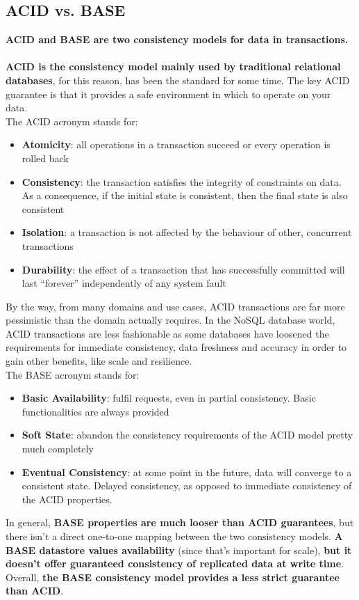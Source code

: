 \documentclass[10pt,a4paper]{article}
\newcommand{\nline}{\\~\\}
\begin{document}
\subsection{ACID vs. BASE}
\textbf{ACID and BASE are two consistency models for data in transactions.}
\nline
\textbf{ACID is the consistency model mainly used by traditional relational databases}, for this reason, has been the standard for some time. The key ACID guarantee is that it provides a safe environment in which to operate on your data. \\
The ACID acronym stands for:
\begin{itemize}
	\item \textbf{Atomicity}: all operations in a transaction succeed or every operation is rolled back
	\item \textbf{Consistency}: the transaction satisfies the integrity of constraints on data. As a consequence, if the initial state is consistent, then the final state is also consistent
	\item \textbf{Isolation}: a transaction is not affected by the behaviour of other, concurrent transactions
	\item \textbf{Durability}: the effect of a transaction that has successfully committed will last “forever” independently of any system fault
\end{itemize}
By the way, from many domains and use cases, ACID transactions are far more pessimistic than the domain actually requires. In the NoSQL database world, ACID transactions are less fashionable as some databases have loosened the requirements for immediate consistency, data freshness and accuracy in order to gain other benefits, like scale and resilience. \\
The BASE acronym stands for:
\begin{itemize}
	\item \textbf{Basic Availability}: fulfil requests, even in partial consistency. Basic functionalities are always provided
	\item \textbf{Soft State}: abandon the consistency requirements of the ACID model pretty much completely
	\item \textbf{Eventual Consistency}: at some point in the future, data will converge to a consistent state. Delayed consistency, as opposed to immediate consistency of the ACID properties.
\end{itemize}
In general, \textbf{BASE properties are much looser than ACID guarantees}, but there isn’t a direct one-to-one mapping between the two consistency models. \textbf{A BASE datastore values availability} (since that’s important for scale), \textbf{but it doesn’t offer guaranteed consistency of replicated data at write time}. Overall, \textbf{the BASE consistency model provides a less strict guarantee than ACID}.
\end{document}
